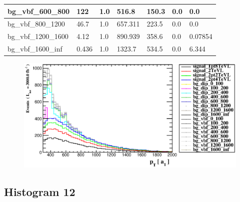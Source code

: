 \documentclass[a4paper, 10pt]{article}
\begin{document}
\begin{table}[H]
\begin{center}
\begin{tabular}{|m{23.0mm}|m{23.0mm}|m{18.0mm}|m{19.0mm}|m{19.0mm}|m{19.0mm}|m{19.0mm}|}
      \hline
      {\cellcolor{white}         bg\_vbf\_600\_800}& {\cellcolor{white}         122}& {\cellcolor{white}         1.0}& {\cellcolor{white}         516.8}& {\cellcolor{white}         150.3}& {\cellcolor{green}         0.0}& {\cellcolor{green}         0.0}\\
      \hline
      {\cellcolor{white}         bg\_vbf\_800\_1200}& {\cellcolor{white}         46.7}& {\cellcolor{white}         1.0}& {\cellcolor{white}         657.311}& {\cellcolor{white}         223.5}& {\cellcolor{green}         0.0}& {\cellcolor{green}         0.0}\\
      \hline
      {\cellcolor{white}         bg\_vbf\_1200\_1600}& {\cellcolor{white}         4.12}& {\cellcolor{white}         1.0}& {\cellcolor{white}         890.939}& {\cellcolor{white}         358.6}& {\cellcolor{green}         0.0}& {\cellcolor{green}         0.07854}\\
      \hline
      {\cellcolor{white}         bg\_vbf\_1600\_inf}& {\cellcolor{white}         0.436}& {\cellcolor{white}         1.0}& {\cellcolor{white}         1323.7}& {\cellcolor{white}         534.5}& {\cellcolor{orange}         0.0}& {\cellcolor{orange}         6.344}\\
\hline
    \end{tabular}
  \end{center}
\end{table}

\begin{figure}[H]
  \begin{center}
    \includegraphics[scale=0.45]{selection_10.eps}\\
\caption{   }
  \end{center}
\end{figure}
      \newpage
\subsection{ Histogram 12}
\end{document}
